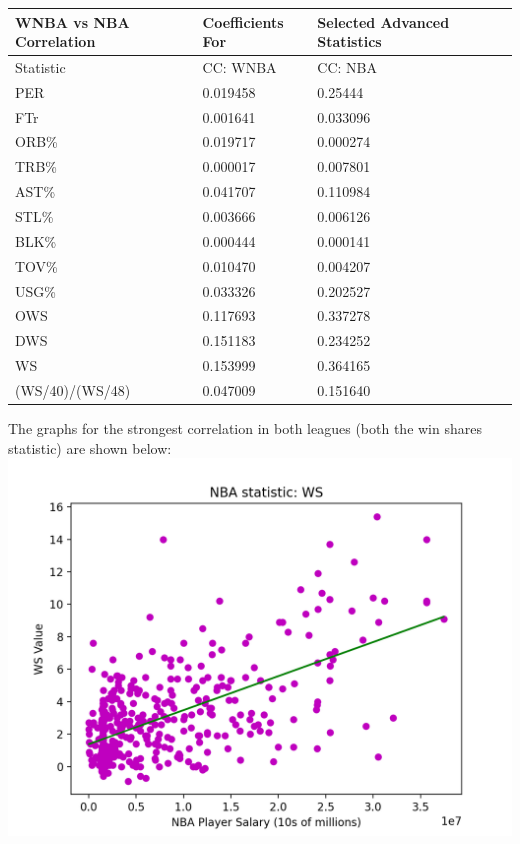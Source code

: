 \documentclass[12pt]{article}
\begin{document}
\begin{tabular}{*5l}    \toprule
WNBA vs NBA Correlation & Coefficients For & Selected Advanced Statistics \\\midrule

Statistic 
&  CC: WNBA   & CC: NBA \\ 

 PER  &  0.019458  & 0.25444 \\
 FTr   &  0.001641   & 0.033096        \\       
 ORB\%   &  0.019717   & 0.000274       \\         
 TRB\%   &  0.000017   & 0.007801        \\
 AST\%   &  0.041707   & 0.110984         \\
 STL\%  &  0.003666   & 0.006126        \\    
 BLK\%  & 0.000444    & 0.000141      \\
 TOV\%  & 0.010470   & 0.004207     \\
 USG\%   & 0.033326    & 0.202527        \\
 OWS   & 0.117693    & 0.337278        \\
 DWS  & 0.151183    & 0.234252         \\
 WS   &  0.153999  & 0.364165                  \\
 (WS/40)/(WS/48)   &  0.047009   & 0.151640        \\
 \hline
\end{tabular}
\newline
\par
The graphs for the strongest correlation in both leagues (both the win shares statistic) are shown below:
\newline
\includegraphics[width=.85\textwidth]{NBA_WS_Graph.png}
\end{document}
